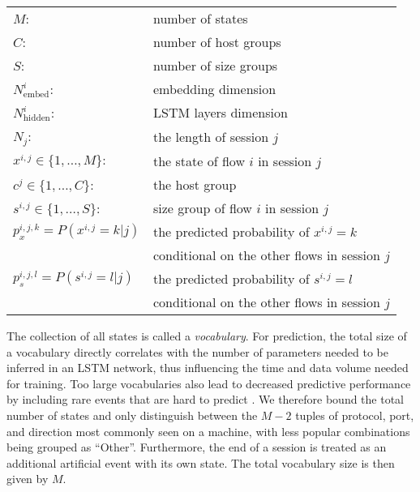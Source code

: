 \vspace{0.35cm}
\begin{center}
\begin{tabular}{l l}
$M$:&number of states \\[0.2cm]
$C$:&number of host groups \\[0.2cm]
$S$:&number of size groups \\[0.2cm]
$N^i_{\text{embed}}$:& embedding dimension\\[0.2cm]
$N^i_{\text{hidden}}$:& LSTM layers dimension \\[0.2cm]
$N_j$:& the length of session $j$\\[0.2cm]
$x^{i,j}\in\{1,\dots,M\}:$%
& the state of flow $i$ in %
session $j$\\[0.2cm]
$c^{j}\in\{1,\dots,C\}$:%
& the host group%
\\[0.2cm]
$s^{i,j}\in\{1,\dots,S\}$: & size group of flow $i$ in %
session $j$\\[0.2cm]
$p_x^{i,j,k}=P(x^{i,j}=k|j)$& the predicted probability of $x^{i,j}=k$\\
& conditional on the other flows in session $j$ \\[0.2cm] 
$p_s^{i,j,l}=P(s^{i,j}=l|j)$& the predicted probability of $s^{i,j}=l$\\
& conditional on the other flows in session $j$ \\[0.2cm] %
\end{tabular}
\vspace{0.35cm}
\end{center}
The collection of all states is called a \emph{vocabulary}. For prediction, the total size of a vocabulary directly correlates with the number of parameters needed to be inferred in an LSTM network, thus influencing the time and data volume needed for training. Too large vocabularies also lead to decreased predictive performance by including rare events that are hard to predict \cite{chen2015strategies}. We therefore bound the total number of states and only distinguish between the $M-2$ tuples of protocol, port, and direction most commonly seen on a machine, with less popular combinations being grouped as ``Other''. Furthermore, the end of a session is treated as an additional artificial event  with its own state. The total vocabulary size is then given by $M$. 

